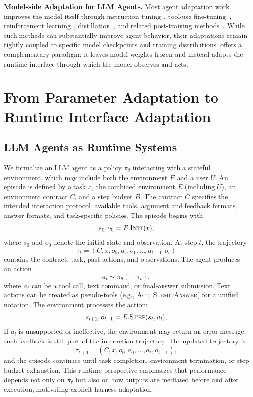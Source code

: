 \noindent \textbf{Model-side Adaptation for LLM Agents.}
Most agent adaptation work improves the model itself through instruction tuning~\cite{qwen2.5}, tool-use fine-tuning~\cite{prabhakar2026apigen_Salesforce_xLAM2}, reinforcement learning~\cite{guo2025deepseek_Deepseek-r1,xu2026cleaner,qian2026toolrl}, distillation~\cite{lu2025onpolicydistillation}, and related post-training methods~\cite{dubey2024llama,qwen3technicalreport,deepseekai2026deepseekv4,xiao2026mimo}.
While such methods can substantially improve agent behavior, their adaptations remain tightly coupled to specific model checkpoints and training distributions. \method{} offers a complementary paradigm: it leaves model weights frozen and instead adapts the runtime interface through which the model observes and acts.

\section{From Parameter Adaptation to Runtime Interface Adaptation}
\label{sec:preliminaries}

\subsection{LLM Agents as Runtime Systems}
\label{subsec:agents-runtime}

We formalize an LLM agent as a policy \(\pi_\theta\) interacting with a stateful environment, which may include both the environment \(E\) and a user \(U\). An episode is defined by a task \(x\), the combined environment \(E\) (including \(U\)), an environment contract \(C\), and a step budget \(B\). The contract \(C\) specifies the intended interaction protocol: available tools, argument and feedback formats, answer formats, and task-specific policies. The episode begins with
\[
    s_0, o_0 = E.\textsc{Init}(x),
\]
where \(s_0\) and \(o_0\) denote the initial state and observation. At step \(t\), the trajectory
\[
    \tau_t = (C, x, o_0, a_0, o_1, \ldots, a_{t-1}, o_t)
\]
contains the contract, task, past actions, and observations. The agent produces an action
\[
    a_t \sim \pi_\theta(\cdot \mid \tau_t),
\]
where \(a_t\) can be a tool call, text command, or final-answer submission. Text actions can be treated as pseudo-tools (e.g., \textsc{Act}, \textsc{SubmitAnswer}) for a unified notation. The environment processes the action:
\[
    s_{t+1}, o_{t+1} = E.\textsc{Step}(s_t, a_t),
\]
If \(a_t\) is unsupported or ineffective, the environment may return an error message; such feedback is still part of the interaction trajectory. The updated trajectory is
\[
    \tau_{t+1} = (C, x, o_0, a_0, \ldots, a_t, o_{t+1}),
\]
and the episode continues until task completion, environment termination, or step budget exhaustion.
This runtime perspective emphasizes that performance depends not only on \(\pi_\theta\) but also on how outputs are mediated before and after execution, motivating explicit harness adaptation.

